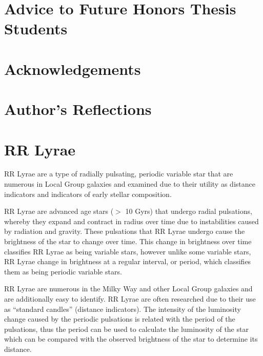 \documentclass[]{article}
\begin{document}
\newpage

\doublespacing

\tableofcontents

\newpage


\section{Advice to Future Honors Thesis Students}

\newpage

\section{Acknowledgements}

\newpage

\section{Author's Reflections}

\newpage

\section{RR Lyrae}

RR Lyrae are a type of radially pulsating, periodic variable star that are numerous in Local Group galaxies and examined due to their utility as distance indicators and indicators of early stellar composition. \cite{szczygiel_2009, kinemuchi_2006_a}

RR Lyrae are advanced age stars ($>$ 10 Gyrs) that undergo radial pulsations, whereby they expand and contract in radius over time due to instabilities caused by radiation and gravity. \cite{szczygiel_2009, templeton_2010} These pulsations that RR Lyrae undergo cause the brightness of the star to change over time. This change in brightness over time classifies RR Lyrae as being variable stars, however unlike some variable stars, RR Lyrae change in brightness at a regular interval, or period, which classifies them as being periodic variable stars. \cite{AAVSO_nodate}

RR Lyrae are numerous in the Milky Way and other Local Group galaxies and are additionally easy to identify. \cite{soszynski_2016, kinemuchi_2006} RR Lyrae are often researched due to their use as ``standard candles'' (distance indicators). \cite{soszynski_2016} The intensity of the luminosity change caused by the periodic pulsations is related with the period of the pulsations, thus the period can be used to calculate the luminosity of the star which can be compared with the observed brightness of the star to determine its distance. \cite{templeton_2010}
\end{document}
